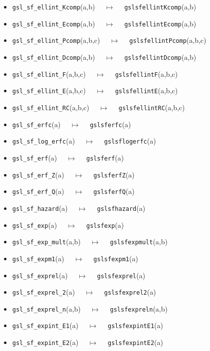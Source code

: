 \documentclass[a4paper,twoside,12pt]{book}
\begin{document}
{\begin{itemize}
\item \texttt{gsl\_sf\_ellint\_Kcomp}(a,b) $\quad \mapsto\quad $ \texttt{gslsfellintKcomp}(a,b) 
\item \texttt{gsl\_sf\_ellint\_Ecomp}(a,b) $\quad \mapsto\quad $ \texttt{gslsfellintEcomp}(a,b) 
\item \texttt{gsl\_sf\_ellint\_Pcomp}(a,b,c) $\quad \mapsto\quad $ \texttt{gslsfellintPcomp}(a,b,c) 
\item \texttt{gsl\_sf\_ellint\_Dcomp}(a,b) $\quad \mapsto\quad $ \texttt{gslsfellintDcomp}(a,b) 
\item \texttt{gsl\_sf\_ellint\_F}(a,b,c) $\quad \mapsto\quad $ \texttt{gslsfellintF}(a,b,c) 
\item \texttt{gsl\_sf\_ellint\_E}(a,b,c) $\quad \mapsto\quad $ \texttt{gslsfellintE}(a,b,c) 
\item \texttt{gsl\_sf\_ellint\_RC}(a,b,c) $\quad \mapsto\quad $ \texttt{gslsfellintRC}(a,b,c) 
\item \texttt{gsl\_sf\_erfc}(a) $\quad \mapsto\quad $ \texttt{gslsferfc}(a) 
\item \texttt{gsl\_sf\_log\_erfc}(a) $\quad \mapsto\quad $ \texttt{gslsflogerfc}(a) 
\item \texttt{gsl\_sf\_erf}(a) $\quad \mapsto\quad $ \texttt{gslsferf}(a) 
\item \texttt{gsl\_sf\_erf\_Z}(a) $\quad \mapsto\quad $ \texttt{gslsferfZ}(a) 
\item \texttt{gsl\_sf\_erf\_Q}(a) $\quad \mapsto\quad $ \texttt{gslsferfQ}(a) 
\item \texttt{gsl\_sf\_hazard}(a) $\quad \mapsto\quad $ \texttt{gslsfhazard}(a) 
\item \texttt{gsl\_sf\_exp}(a) $\quad \mapsto\quad $ \texttt{gslsfexp}(a) 
\item \texttt{gsl\_sf\_exp\_mult}(a,b) $\quad \mapsto\quad $ \texttt{gslsfexpmult}(a,b) 
\item \texttt{gsl\_sf\_expm1}(a) $\quad \mapsto\quad $ \texttt{gslsfexpm1}(a) 
\item \texttt{gsl\_sf\_exprel}(a) $\quad \mapsto\quad $ \texttt{gslsfexprel}(a) 
\item \texttt{gsl\_sf\_exprel\_2}(a) $\quad \mapsto\quad $ \texttt{gslsfexprel2}(a) 
\item \texttt{gsl\_sf\_exprel\_n}(a,b) $\quad \mapsto\quad $ \texttt{gslsfexpreln}(a,b) 
\item \texttt{gsl\_sf\_expint\_E1}(a) $\quad \mapsto\quad $ \texttt{gslsfexpintE1}(a) 
\item \texttt{gsl\_sf\_expint\_E2}(a) $\quad \mapsto\quad $ \texttt{gslsfexpintE2}(a) 

\end{itemize}}
\end{document}
